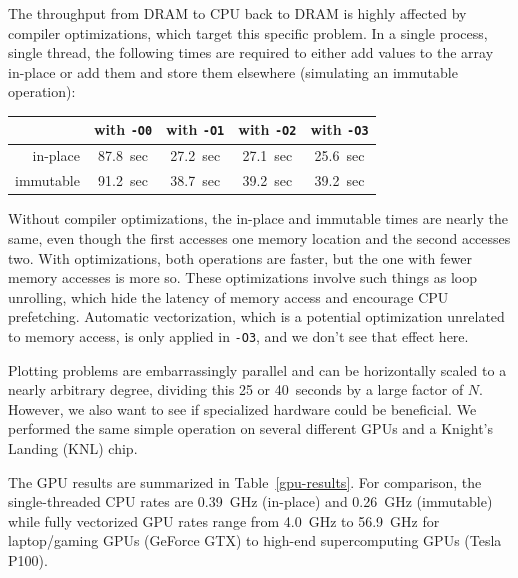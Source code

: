 \documentclass[12pt]{article}
\begin{document}
The throughput from DRAM to CPU back to DRAM is highly affected by compiler optimizations, which target this specific problem. In a single process, single thread, the following times are required to either add values to the array in-place or add them and store them elsewhere (simulating an immutable operation):

\begin{center}
\begin{tabular}{r | c c c c}
           & with {\tt -O0} & with {\tt -O1} & with {\tt -O2} & with {\tt -O3} \\\hline
in-place   & 87.8~sec       & 27.2~sec       & 27.1~sec       & 25.6~sec       \\
immutable  & 91.2~sec       & 38.7~sec       & 39.2~sec       & 39.2~sec       \\
\end{tabular}
\end{center}

Without compiler optimizations, the in-place and immutable times are nearly the same, even though the first accesses one memory location and the second accesses two. With optimizations, both operations are faster, but the one with fewer memory accesses is more so. These optimizations involve such things as loop unrolling, which hide the latency of memory access and encourage CPU prefetching. Automatic vectorization, which is a potential optimization unrelated to memory access, is only applied in {\tt -O3}, and we don't see that effect here.

Plotting problems are embarrassingly parallel and can be horizontally scaled to a nearly arbitrary degree, dividing this 25 or 40~seconds by a large factor of $N$. However, we also want to see if specialized hardware could be beneficial. We performed the same simple operation on several different GPUs and a Knight's Landing (KNL) chip.

The GPU results are summarized in Table~\ref{gpu-results}. For comparison, the single-threaded CPU rates are 0.39~GHz (in-place) and 0.26~GHz (immutable) while fully vectorized GPU rates range from 4.0~GHz to 56.9~GHz for laptop/gaming GPUs (GeForce GTX) to high-end supercomputing GPUs (Tesla P100).
\end{document}
